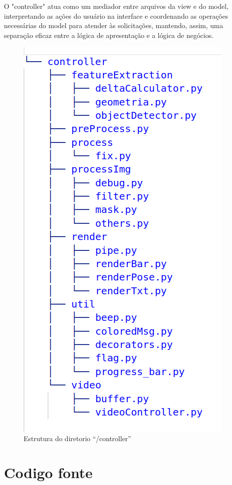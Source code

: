 O "controller" atua como um mediador entre arquivos da view e do model, interpretando as ações do usuário na interface e coordenando as operações necessárias do model para atender às solicitações, mantendo, assim, uma separação eficaz entre a lógica de apresentação e a lógica de negócios.

\begin{figure}[!htb]
	\centering
	\includegraphics[scale=0.6]{figuras/diretorios/controller.png}
	\caption{Estrutura do diretorio ``/controller''}
	\label{fig:controller}
\end{figure}
\newpage


\section[Codigo fonte]{Codigo fonte}

